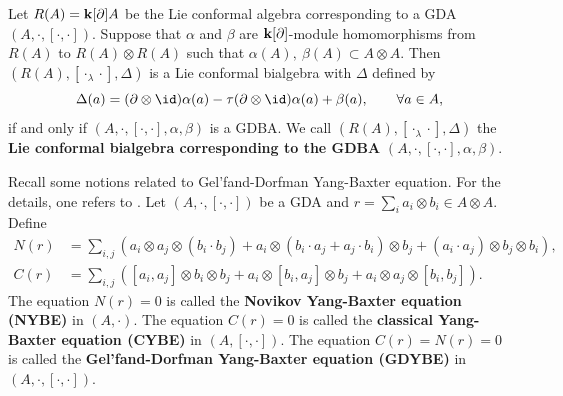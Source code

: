 \documentclass[12pt]{amsart}
\begin{document}
\begin{proposition}\cite[Theorem 2.17]{HBG}\label{lbgb}
    Let $ R(A)={\bf k}[\partial]A$ be the Lie conformal algebra corresponding to a GDA $(A,\cdot,[\cdot,\cdot])$. Suppose that $\alpha$ and $\beta$ are ${\bf k}[\partial]$-module homomorphisms from $ R(A)$ to $ R(A)\otimes  R(A)$ such that $\alpha(A),~\beta(A)\subset A\otimes A$. Then $(  R(A),[\cdot_\lambda\cdot],\Delta)$ is a Lie conformal bialgebra with $\Delta$ defined by
    \begin{equation}\label{eq-lcc-gdc}
        \Delta(a)=(\partial\otimes \id)\alpha(a)-\tau(\partial\otimes \id)\alpha(a)+\beta(a), \qquad \forall a\in A,
    \end{equation}
    if and only if $(A,\cdot,[\cdot,\cdot],\alpha,\beta)$ is a GDBA. We call $(  R(A),[\cdot_\lambda\cdot],\Delta)$ the {\bf Lie conformal bialgebra corresponding to the GDBA} $(A,\cdot,[\cdot,\cdot],\alpha,\beta)$.
\end{proposition}



Recall some notions related to Gel'fand-Dorfman Yang-Baxter
equation. For the details, one refers to \cite{HBG}.
Let $(A,\cdot,[\cdot,\cdot])$ be a GDA and $r=\sum_i a_i\otimes b_i\in A\otimes A$. Define
\begin{align*}
    N(r)&=\sum_{i,j}(a_i\otimes a_j\otimes ({b_i}\cdot b_j) +a_i\otimes (b_i\cdot a_j+a_j\cdot b_i)\otimes b_j+(a_i\cdot a_j)\otimes b_j\otimes b_i),\\
    C(r)&=\sum_{i,j}( [a_i,a_j]\otimes b_i\otimes b_j+a_i\otimes[b_i,a_j]\otimes b_j+a_i\otimes a_j\otimes [b_i, b_j]).
\end{align*}
The equation $N(r)=0$ is called the {\bf Novikov Yang-Baxter
equation (NYBE)} in $(A,\cdot)$. The equation $C(r)=0$ is called
the {\bf classical Yang-Baxter equation (CYBE)} in
$(A,[\cdot,\cdot])$. The equation $C(r)=N(r)=0$ is called the {\bf
Gel'fand-Dorfman Yang-Baxter equation (GDYBE)}  in
$(A,\cdot,[\cdot,\cdot])$.

\end{document}
